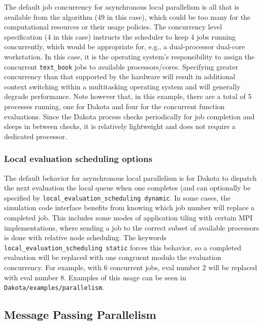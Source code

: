 The default job concurrency for asynchronous local parallelism is all
that is available from the algorithm (49 in this case), which could be
too many for the computational resources or their usage policies.  The
concurrency level specification (4 in this case) instructs the
scheduler to keep 4 jobs running concurrently, which would be
appropriate for, e.g., a dual-processor dual-core workstation.  In
this case, it is the operating system's responsibility to assign the
concurrent \texttt{text\_book} jobs to available processors/cores.
Specifying greater concurrency than that supported by the hardware
will result in additional context switching within a multitasking
operating system and will generally degrade performance.  Note however
that, in this example, there are a total of 5 processes running, one
for Dakota and four for the concurrent function evaluations.  Since
the Dakota process checks periodically for job completion and sleeps
in between checks, it is relatively lightweight and does not require a
dedicated processor.

\subsubsection{Local evaluation scheduling options}\label{parallel:SLP:local:sched}

The default behavior for asynchronous local parallelism is for Dakota
to dispatch the next evaluation the local queue when one completes
(and can optionally be specified by
\texttt{local\_evaluation\_scheduling dynamic}.  In some cases, the
simulation code interface benefits from knowing which job number will
replace a completed job.  This includes some modes of application
tiling with certain MPI implementations, where sending a job to the
correct subset of available processors is done with relative node
scheduling.  The keywords
\texttt{local\_evaluation\_scheduling static} forces this behavior,
so a completed evaluation will be replaced with one congruent modulo
the evaluation concurrency.  For example, with 6 concurrent jobs, eval
number 2 will be replaced with eval number 8.  Examples of this usage
can be seen in \texttt{Dakota/examples/parallelism}.


\subsection{Message Passing Parallelism}\label{parallel:SLP:message}

